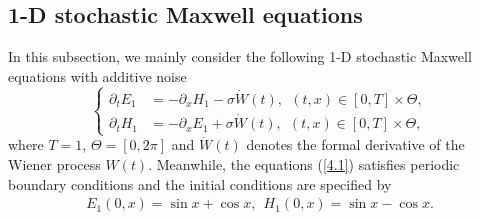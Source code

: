 \documentclass[preprint,12pt]{article}
\numberwithin{figure}{section}
\numberwithin{table}{section}
\numberwithin{equation}{section}
\begin{document}
\subsection{1-D stochastic Maxwell equations}
In this subsection, we mainly consider the following 1-D stochastic Maxwell equations with additive noise
\begin{equation}\label{4.1}
\left\{
\begin{split}
\partial_{t}E_{1}&=-\partial_{x}H_{1}-\sigma\dot{W}(t),~~(t,x)\in[0,T]\times\Theta,\\[2mm]
\partial_{t}H_{1}&=-\partial_{x}E_{1}+\sigma\dot{W}(t),~~(t,x)\in[0,T]\times\Theta,
\end{split}\right.
\end{equation}
where $T=1$,  $\Theta =\left [0, 2\pi \right]$ and $\dot{W}(t)$ denotes the formal derivative of the Wiener process $W(t)$. Meanwhile, the equations (\ref{4.1}) satisfies periodic boundary conditions and the initial conditions are specified by
\begin{equation*}
\begin{split}
E_{1}(0,x)=\sin{x}+\cos{x},~~H_{1}(0,x)=\sin{x}-\cos{x}.
\end{split}
\end{equation*}
\end{document}
